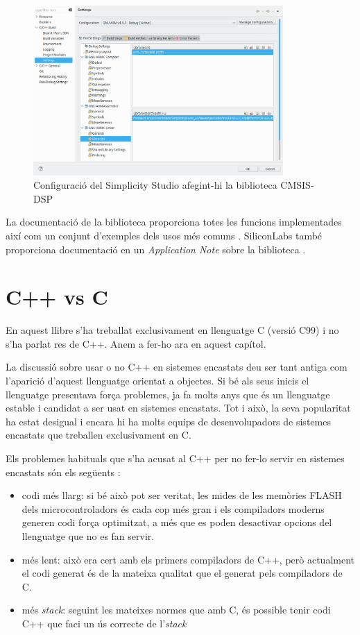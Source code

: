 \begin{figure}
 \centering
 \includegraphics[width=0.85\textwidth, keepaspectratio]{imatges/EnablingDSP_Lib.png}
 \caption{Configuració del Simplicity Studio afegint-hi la biblioteca CMSIS-DSP}
 \label{fig:EnableDSP}
\end{figure}

La documentació de la biblioteca proporciona totes les funcions implementades així com un conjunt d'exemples dels usos més comuns \cite{CORE-DSP}. SiliconLabs també proporciona documentació en un {\em Application Note} sobre la biblioteca \cite{AN0051}.

\chapter{C++ vs C}
\label{ch:CvsCPP}
En aquest llibre s'ha treballat exclusivament en llenguatge C (versió C99) i no s'ha parlat res de C++. Anem a fer-ho ara en aquest capítol.

La discussió sobre usar o no C++ en sistemes encastats deu ser tant antiga com l'aparició d'aquest llenguatge orientat a objectes. Si bé als seus inicis el llenguatge presentava força problemes, ja fa molts anys que és un llenguatge estable i candidat a ser usat en sistemes encastats. Tot i això, la seva popularitat ha estat desigual i encara hi ha molts equips de desenvolupadors de sistemes encastats que treballen exclusivament en C.

Els problemes habituals que s'ha acusat al C++ per no fer-lo servir en sistemes encastats són els següents \cite{CXX_1}:
\begin{itemize}
 \item codi més llarg: si bé això pot ser veritat, les mides de les memòries \gls{FLASH} dels microcontroladors és cada cop més gran i els compiladors moderns generen codi força optimitzat, a més que es poden desactivar opcions del llenguatge que no es fan servir.
 \item més lent: això era cert amb els primers compiladors de C++, però actualment el codi generat és de la mateixa qualitat que el generat pels compiladors de C.
 \item més {\em stack}: seguint les mateixes normes que amb C, és possible tenir codi C++ que faci un ús correcte de l'{\em stack}
\end{itemize}

